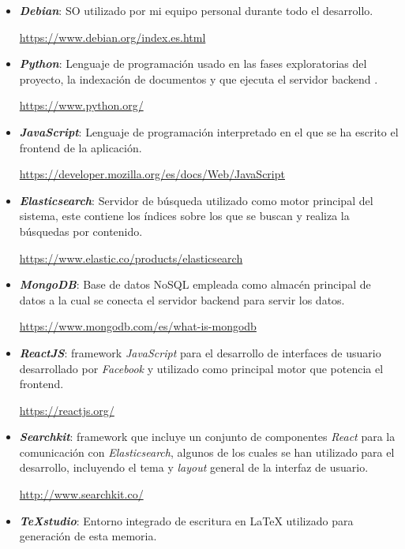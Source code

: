 \begin{itemize}
	\item \textit{\textbf{Debian}}: \acrfull{SO} utilizado por mi equipo personal durante todo el desarrollo. 
	
	\url{https://www.debian.org/index.es.html}
	
	\item \textit{ \textbf{Python}}: Lenguaje de programación usado en las fases exploratorias del proyecto, la indexación de documentos y que ejecuta el servidor \gls{backend} .
	
	\url{https://www.python.org/}
	
	\item \textit{\textbf{JavaScript}}: Lenguaje de programación interpretado en el que se ha escrito el \gls{frontend}  de la aplicación.
	
	\url{https://developer.mozilla.org/es/docs/Web/JavaScript}
	
	
	\item \textit{\textbf{Elasticsearch}}: Servidor de búsqueda utilizado como motor principal del sistema, este contiene los índices sobre los que se buscan y realiza la búsquedas por contenido.
	
	\url{https://www.elastic.co/products/elasticsearch}
	
	
	\item \textit{\textbf{MongoDB}}: Base de datos NoSQL empleada como almacén principal de datos a la cual se conecta el servidor \gls{backend} para servir los datos.
	
	\url{https://www.mongodb.com/es/what-is-mongodb}
	
	\item \textit{\textbf{ReactJS}}:  \Gls{framework} \textit{JavaScript} para el desarrollo de interfaces de usuario desarrollado por \textit{Facebook} y utilizado como principal motor que potencia el \gls{frontend}.
	
	\url{https://reactjs.org/}
	
	\item \textit{\textbf{Searchkit}}: \Gls{framework} que incluye un conjunto de componentes \textit{React} para la comunicación con \textit{Elasticsearch}, algunos de los cuales se han utilizado para el desarrollo, incluyendo el tema y \textit{layout} general de la interfaz de usuario.
	
	\url{http://www.searchkit.co/}
	
	\item \textit{\textbf{TeXstudio}}: Entorno integrado de escritura en \LaTeX{} utilizado para generación de esta memoria.
	

\end{itemize}
